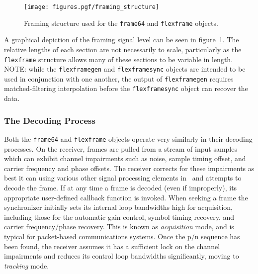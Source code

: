% 
%
\begin{figure}
\centering
  \texttt{[image: figures.pgf/framing\_structure]}
\caption{
    Framing structure used for the {\tt frame64} and {\tt flexframe}
    objects.}
\label{fig:module:framing:structure}
\end{figure}
%
A graphical depiction of the framing signal level can be seen in
figure~\ref{fig:module:framing:structure}.
The relative lengths of each section are not necessarily to scale,
particularly as the {\tt flexframe} structure allows many of these sections to
be variable in length.
%
NOTE: while the {\tt flexframegen} and {\tt flexframesync} objects are
intended to be used in conjunction with one another, the output of
{\tt flexframegen} requires matched-filtering interpolation before the
{\tt flexframesync} object can recover the data.


\subsubsection{The Decoding Process}
\label{module:framing:frames:decoding}
Both the {\tt frame64} and {\tt flexframe} objects operate very
similarly in their decoding processes.
On the receiver, frames are pulled from a stream of input samples which
can exhibit channel impairments such as noise, sample timing offset, and
carrier frequency and phase offsets.
The receiver corrects for these impairments as best it can using various
other signal processing elements in \liquid\ and attempts to decode the
frame.
If at any time a frame is decoded (even if improperly), its appropriate
user-defined callback function is invoked.
%
When seeking a frame the synchronizer initially sets its internal loop
bandwidths high for acquisition, including those for the automatic gain
control, symbol timing recovery, and carrier frequency/phase recovery.
This is known as {\em acquisition} mode, and is typical for packet-based
communications systems.
Once the p/n sequence has been found, the receiver assumes it has a
sufficient lock on the channel impairments and reduces its control loop
bandwidths significantly, moving to {\em tracking} mode.

